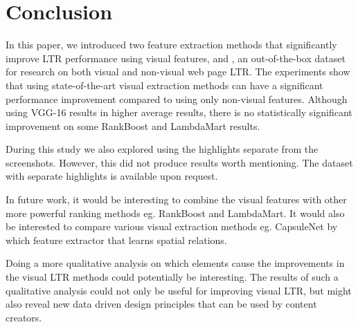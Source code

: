 
\section{Conclusion}
In this paper, we introduced two feature extraction methods that significantly improve \ac{LTR} performance using visual features, and \datasetname, an out-of-the-box dataset for research on both visual and non-visual web page \ac{LTR}.
The experiments show that using state-of-the-art visual extraction methods can have a significant performance improvement compared to using only non-visual features. Although using VGG-16 results in higher average results, there is no statistically significant improvement on some RankBoost and LambdaMart results. 

 During this study we also explored using the highlights separate from the screenshots. However, this did not produce results worth mentioning. The dataset with separate highlights is available upon request. 
\fi

In future work, it would be interesting to combine the visual features with other more powerful ranking methods eg. RankBoost and LambdaMart. It would also be interested to compare various visual extraction methods eg. CapsuleNet by \citet{sabour2017dynamic} which feature extractor that learns spatial relations. 

Doing a more qualitative analysis on which elements cause the improvements in the visual \ac{LTR} methods could potentially be interesting. The results of such a qualitative analysis could not only be useful for improving visual \ac{LTR}, but might also reveal new data driven design principles that can be used by content creators. 